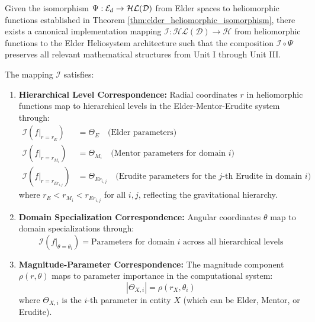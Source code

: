 \begin{theorem}
\label{thm:helio_to_architecture}
Given the isomorphism $\Psi: \mathcal{E}_{d} \rightarrow \mathcal{HL}(\mathcal{D})$ from Elder spaces to heliomorphic functions established in Theorem \ref{thm:elder_heliomorphic_isomorphism}, there exists a canonical implementation mapping $\mathcal{I}: \mathcal{HL}(\mathcal{D}) \rightarrow \mathcal{H}$ from heliomorphic functions to the Elder Heliosystem architecture such that the composition $\mathcal{I} \circ \Psi$ preserves all relevant mathematical structures from Unit I through Unit III.

The mapping $\mathcal{I}$ satisfies:
\begin{enumerate}
    \item \textbf{Hierarchical Level Correspondence:} Radial coordinates $r$ in heliomorphic functions map to hierarchical levels in the Elder-Mentor-Erudite system through:
    \begin{align}
        \mathcal{I}(f|_{r=r_E}) &= \Theta_E \quad \text{(Elder parameters)} \\
        \mathcal{I}(f|_{r=r_{M_i}}) &= \Theta_{M_i} \quad \text{(Mentor parameters for domain $i$)} \\
        \mathcal{I}(f|_{r=r_{Er_{i,j}}}) &= \Theta_{Er_{i,j}} \quad \text{(Erudite parameters for the $j$-th Erudite in domain $i$)}
    \end{align}
    where $r_E < r_{M_i} < r_{Er_{i,j}}$ for all $i,j$, reflecting the gravitational hierarchy.
    
    \item \textbf{Domain Specialization Correspondence:} Angular coordinates $\theta$ map to domain specializations through:
    \begin{equation}
        \mathcal{I}(f|_{\theta=\theta_i}) = \text{Parameters for domain $i$ across all hierarchical levels}
    \end{equation}
    
    \item \textbf{Magnitude-Parameter Correspondence:} The magnitude component $\rho(r,\theta)$ maps to parameter importance in the computational system:
    \begin{equation}
        |\Theta_{X,i}| = \rho(r_X, \theta_i)
    \end{equation}
    where $\Theta_{X,i}$ is the $i$-th parameter in entity $X$ (which can be Elder, Mentor, or Erudite).
    

\end{enumerate}
\end{theorem}
